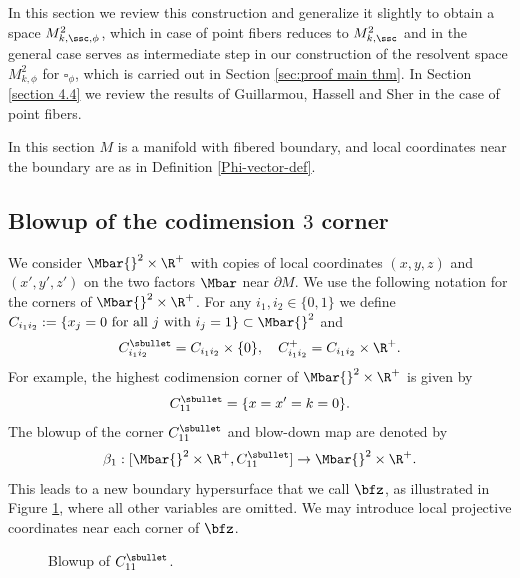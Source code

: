 In this section we review this construction and generalize it slightly to obtain a space $M^2_{k,\ssc,\phi}$, which in case of point fibers reduces to $M^2_{k,\ssc}$ and in the general case serves as intermediate step in our construction of the resolvent space $M^2_{k,\phi}$ for $\square_\phi$, which is carried out in Section \ref{sec:proof main thm}.
In Section \ref{section 4.4} we review the results of Guillarmou, Hassell and Sher in the case of point fibers.

In this section $M$ is a manifold with fibered boundary, and local coordinates near the boundary are as in Definition \ref{Phi-vector-def}.

\subsection{Blowup of the codimension $3$ corner}
We consider $\Mbar{}^2 \times \R^+$ with copies of local
coordinates $(x,y,z)$ and $(x',y',z')$ on the two factors $\Mbar$ near $\partial M$.
We use the following notation for the corners of $\Mbar{}^2\times \R^+$.
For any $i_1,i_2 \in \{0,1\}$ we define
$
C_{i_1i_2} := \{x_j = 0 \text{ for all $j$ with } i_j = 1\} \subset \Mbar{}^2
$
and
\[
C_{i_1i_2}^\sbullet = C_{i_1i_2}\times \{0\},\quad C_{i_1i_2}^+ = C_{i_1i_2} \times \R^+.
\]
For example, the highest codimension corner of $\Mbar{}^2\times \R^+$ is given by
\[
C_{11}^\sbullet = \{ x = x' = k =0\}.
\]
The blowup of the corner $C_{11}^\sbullet$ and blow-down map are denoted by
\[
\beta_1:[\Mbar{}^2 \times \R^+, C_{11}^\sbullet]\to \Mbar{}^2 \times \R^+.
\]
This leads to a new boundary hypersurface that we call $\bfz$, as illustrated in Figure
\ref{figure 4}, where all other variables are omitted. We may introduce local projective coordinates near
each corner of $\bfz$.

\begin{figure}[htb]
\centering
{}
\caption{ Blowup of $C_{11}^\sbullet$.} \label{figure 4}
\end{figure}

